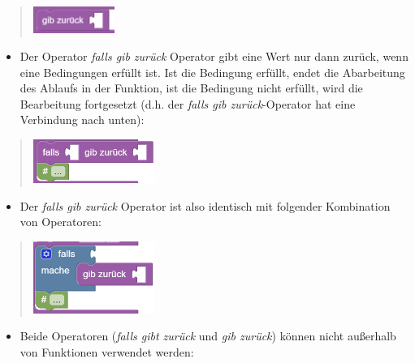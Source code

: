 \documentclass[
  letterpaper,
  DIV=11]{scrreprt}
\providecommand{\tightlist}{%
  \setlength{\itemsep}{0pt}\setlength{\parskip}{0pt}}\usepackage{longtable,booktabs,array}
\begin{document}
\begin{tcolorbox}
\begin{quote}
\includegraphics[width=1.04167in,height=\textheight]{img/screenshot-blockly-function-return-operator-example-01-DEU.png}
\end{quote}

\begin{itemize}
\tightlist
\item
  Der Operator \emph{falls gib zurück} Operator gibt eine Wert nur dann
  zurück, wenn eine Bedingungen erfüllt ist. Ist die Bedingung erfüllt,
  endet die Abarbeitung des Ablaufs in der Funktion, ist die Bedingung
  nicht erfüllt, wird die Bearbeitung fortgesetzt (d.h. der \emph{falls
  gib zurück}-Operator hat eine Verbindung nach unten):
\end{itemize}

\begin{quote}
\includegraphics[width=1.5625in,height=\textheight]{img/screenshot-blockly-function-return-if-operator-example-01-DEU.png}
\end{quote}

\begin{itemize}
\tightlist
\item
  Der \emph{falls gib zurück} Operator ist also identisch mit folgender
  Kombination von Operatoren:
\end{itemize}

\begin{quote}
\includegraphics[width=1.5625in,height=\textheight]{img/screenshot-blockly-function-return-if-operator-equivalent-example-01-DEU.png}
\end{quote}

\begin{itemize}
\tightlist
\item
  Beide Operatoren (\emph{falls gibt zurück} und \emph{gib zurück})
  können nicht außerhalb von Funktionen verwendet werden:
\end{itemize}


\end{tcolorbox}
\end{document}
